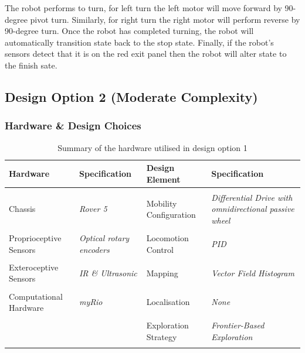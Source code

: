\documentclass[a4paper]{article}
\begin{document}
The robot performs to turn, for left turn the left motor will move forward by 90-degree pivot turn. Similarly, for right turn the right motor will perform reverse by 90-degree turn. Once the robot has completed turning, the robot will automatically transition state back to the stop state. Finally, if the robot’s sensors detect that it is on the red exit panel then the robot will alter state to the finish sate.

\subsection{Design Option 2 (Moderate Complexity)}
\subsubsection{Hardware \& Design Choices}
\begin{table}[h]
\centering
\caption{Summary of the hardware utilised in design option 1}\footnotesize
\begin{tabular}{p{3.5cm}p{3.8cm}p{3.5cm}p{3.8cm}}
\toprule
\textbf{Hardware} & \textbf{Specification} & \textbf{Design Element} & \textbf{Specification}\\
\midrule
& & &\\
Chassis  & \textit{Rover 5} & Mobility Configuration & \textit{Differential Drive with omnidirectional passive wheel}\\
& & &\\
Proprioceptive Sensors & \textit{Optical rotary encoders} & Locomotion Control & \textit{PID}\\
& & &\\
Exteroceptive Sensors & \textit{IR \& Ultrasonic} & Mapping & \textit{Vector Field Histogram}\\
& & & \\
Computational Hardware & \textit{myRio} & Localisation & \textit{None} \\
& & & \\
 & & Exploration Strategy & \textit{Frontier-Based Exploration}\\
& & & \\
\bottomrule
\end{tabular}
\end{table}
\end{document}

